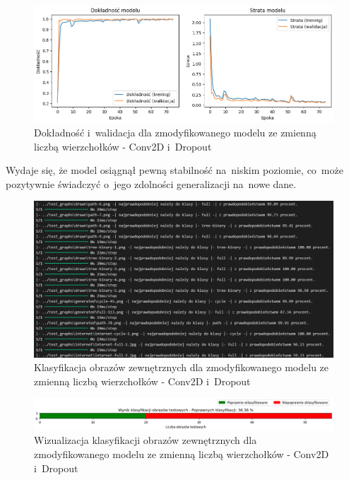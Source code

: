 \begin{figure}[ht]
	\centering
	\includegraphics[width=15.5cm]{resources/tests/images/v4/multiple_edges_1_img.png}
	\caption{Dokładność i~walidacja dla zmodyfikowanego modelu ze zmienną liczbą wierzchołków - Conv2D i~Dropout}
	\label{Fig:tests-var-1a}
\end{figure}
\FloatBarrier

Wydaje się, że model osiągnął pewną stabilność na~niskim poziomie, co~może pozytywnie świadczyć o~jego zdolności generalizacji na~nowe dane.

\begin{figure}[ht]
	\centering
	\includegraphics[width=15.5cm]{resources/tests/images/v4/multiple_edges_1_txt.png}
	\caption{Klasyfikacja obrazów zewnętrznych dla zmodyfikowanego modelu ze zmienną liczbą wierzchołków - Conv2D i~Dropout}
	\label{Fig:tests-var-1b}
\end{figure}
\FloatBarrier

\begin{figure}[ht]
	\centering
	\includegraphics[width=15.5cm]{resources/tests/images/v4/multiple_edges_1_bar.png}
	\caption{Wizualizacja klasyfikacji obrazów zewnętrznych dla zmodyfikowanego modelu ze zmienną liczbą wierzchołków - Conv2D i~Dropout}
	\label{Fig:tests-var-1c}
\end{figure}
\FloatBarrier


